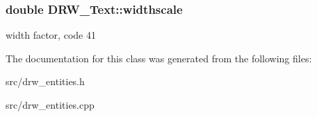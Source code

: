 \subsubsection[{widthscale}]{\setlength{\rightskip}{0pt plus 5cm}double D\+R\+W\+\_\+\+Text\+::widthscale}\label{class_d_r_w___text_a17468f7c0e1bd0b1c6da87cc9300b7e1}
width factor, code 41 

The documentation for this class was generated from the following files\+:\begin{DoxyCompactItemize}
\item 
src/drw\+\_\+entities.\+h\item 
src/drw\+\_\+entities.\+cpp\end{DoxyCompactItemize}
